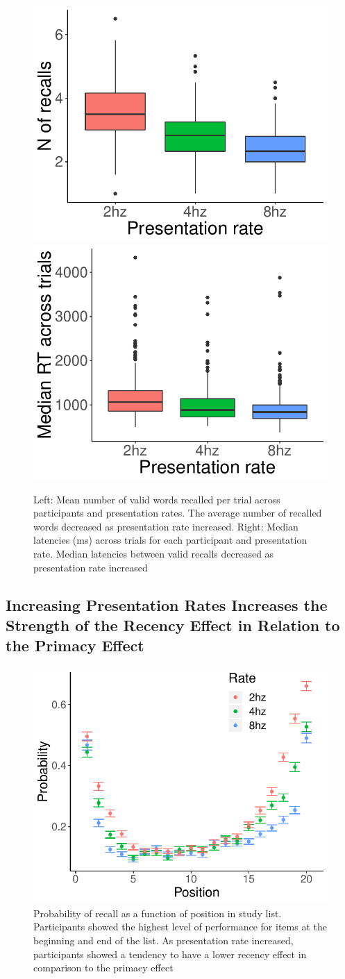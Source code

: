 \documentclass[10pt,letterpaper]{article}
\begin{document}
\begin{figure}[H]
\begin{center}
\includegraphics[width = .23\textwidth]{Images/recall_boxplot.pdf}
\includegraphics[width = .23\textwidth]{Images/rt_boxplot.pdf}
\end{center}
\caption{Left: Mean number of valid words recalled per trial across participants and presentation rates. The average number of recalled words decreased as presentation rate increased. Right: Median latencies (ms) across trials for each participant and presentation rate. Median latencies between valid recalls decreased as presentation rate increased} 
\label{Descriptives}
\end{figure}

\subsection{Increasing Presentation Rates Increases the Strength of the Recency Effect in Relation to the Primacy Effect}

\begin{figure}[H]
\begin{center}
\includegraphics[width = .4\textwidth]{Images/SPC_adjusted.pdf}
\end{center}
\caption{Probability of recall as a function of position in study list. Participants showed the highest level of performance for items at the beginning and end of the list. As presentation rate increased, participants showed a tendency to have a lower recency effect in comparison to the primacy effect} 
\label{SPC}
\end{figure}
\end{document}
